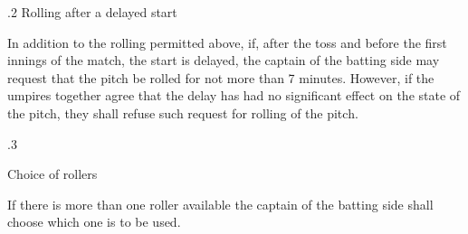 \documentclass[12pt]{article}
\begin{document}
\vspace{\baselineskip}

\vspace{\baselineskip}

\vspace{\baselineskip}

\vspace{\baselineskip}

\vspace{\baselineskip}
\begin{Center}
{\fontsize{8pt}{9.6pt}\par}
\end{Center}\par


\vspace{\baselineskip}
{\fontsize{9pt}{10.8pt}.2 \tabto{0.49in} Rolling after a delayed start\par}\par


\vspace{\baselineskip}
\begin{adjustwidth}{0.5in}{0.1in}
{\fontsize{9pt}{10.8pt}\selectfont In addition to the rolling permitted above, if, after the toss and before the first innings of the match, the start is delayed, the captain of the batting side may request that the pitch be rolled for not more than 7 minutes. However, if the umpires together agree that the delay has had no significant effect on the state of the pitch, they shall refuse such request for rolling of the pitch.\par}\par

\end{adjustwidth}


\vspace{\baselineskip}
{\fontsize{9pt}{10.8pt}.3 \tabto{0.49in} {\fontsize{8pt}{9.6pt}\selectfont Choice of rollers\par}\par}\par


\vspace{\baselineskip}
\begin{adjustwidth}{0.5in}{0.0in}
{\fontsize{8pt}{9.6pt}\selectfont If there is more than one roller available the captain of the batting side shall choose which one is to be used.\par}\par

\end{adjustwidth}
\end{document}
